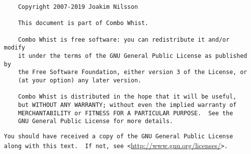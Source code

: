 %
%
%
%

\begin{verbatim}
	Copyright 2007-2019 Joakim Nilsson

	This document is part of Combo Whist.

	Combo Whist is free software: you can redistribute it and/or modify
	it under the terms of the GNU General Public License as published by
	the Free Software Foundation, either version 3 of the License, or
	(at your option) any later version.

	Combo Whist is distributed in the hope that it will be useful,
	but WITHOUT ANY WARRANTY; without even the implied warranty of
	MERCHANTABILITY or FITNESS FOR A PARTICULAR PURPOSE.  See the
	GNU General Public License for more details.
\end{verbatim}
\verb|You should have received a copy of the GNU General Public License|\\
\verb|along with this text.  If not, see <|\url{http://www.gnu.org/licenses/}\verb|>.|
